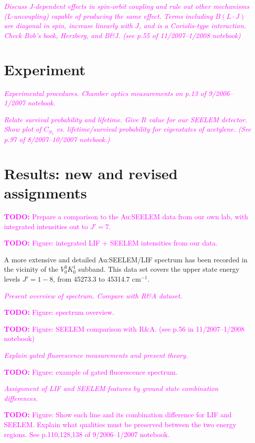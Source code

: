 \documentclass[12pt]{mitthesis}
\newcommand{\TODO} [1]{\textcolor{magenta}{\textbf{TODO:} #1}}
\newcommand{\POINT}[1]{\textcolor{magenta}{\emph{#1}}}
\newcommand{\rcm}{cm$^{-1}$}
\begin{document}
\POINT{Discuss J-dependent effects in spin-orbit coupling and rule out
  other mechanisms (L-uncoupling) capable of producing the same
  effect. Terms including $B(L \cdot J)$ are diagonal in spin,
  increase linearly with $J$, and is a Coriolis-type interaction.
  Check Bob's book, Herzberg, and B\&J.  (see p.55 of 11/2007--1/2008
  notebook)}



\section{Experiment}

\POINT{Experimental procedures.  Chamber optics measurements on p.13
  of 9/2006--1/2007 notebook.}

\POINT{Relate survival probability and lifetime. Give $R$ value for
  our SEELEM detector.  Show plot of $C_{S_1}$ vs. lifetime/survival
  probability for eigenstates of acetylene.  (See p.97 of
  8/2007--10/2007 notebook.)}

\section{Results: new and revised assignments}

\TODO{Prepare a comparison to the Au:SEELEM data from our own lab, with
integrated intensities out to $J' = 7$.}

\TODO{Figure: integrated LIF + SEELEM intensities from our data.}



A more extensive and detailed Au:SEELEM/LIF spectrum has been recorded
in the vicinity of the $V^3_0K^1_0$ subband. This data set covers the
upper state energy levels $J'=1-8$, from 45273.3 to 45314.7 \rcm.

\POINT{Present overview of spectrum.  Compare with R\&A dataset.}

\TODO{Figure: spectrum overview.}

\TODO{Figure: SEELEM comparison with R\&A. (see p.56 in
  11/2007--1/2008 notebook)}

\POINT{Explain gated fluorescence measurements and present theory.}

\TODO{Figure: example of gated fluorescence spectrum.}

\POINT{Assignment of LIF and SEELEM features by ground state
  combination differences.}

\TODO{Figure: Show each line and its combination difference for LIF
  and SEELEM.  Explain what qualities must be preserved between the
  two energy regions.  See p.110,128,138 of 9/2006--1/2007 notebook.}
\end{document}
